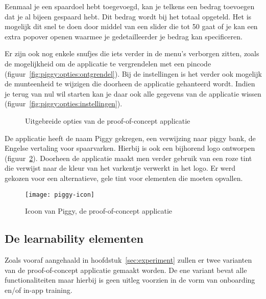 Eenmaal je een spaardoel hebt toegevoegd, kan je telkens een bedrag toevoegen dat je al bijeen gespaard hebt. Dit bedrag wordt bij het totaal opgeteld. Het is mogelijk dit snel te doen door middel van een slider die tot 50 gaat of je kan een extra popover openen waarmee je gedetailleerder je bedrag kan specificeren.

Er zijn ook nog enkele snufjes die iets verder in de menu's verborgen zitten, zoals de mogelijkheid om de applicatie te vergrendelen met een pincode (figuur~\ref{fig:piggy:opties:ontgrendel}). Bij de instellingen is het verder ook mogelijk de munteenheid te wijzigen die doorheen de applicatie gehanteerd wordt. Indien je terug van nul wil starten kan je daar ook alle gegevens van de applicatie wissen (figuur~\ref{fig:piggy:opties:instellingen}).

\begin{figure}[h!]
    \centering
    \qquad
    \caption{Uitgebreide opties van de proof-of-concept applicatie}
    \label{fig:piggy:opties}
\end{figure}

De applicatie heeft de naam Piggy gekregen, een verwijzing naar piggy bank, de Engelse vertaling voor spaarvarken. Hierbij is ook een bijhorend logo ontworpen (figuur~\ref{fig:piggy:icoon}). Doorheen de applicatie maakt men verder gebruik van een roze tint die verwijst naar de kleur van het varkentje verwerkt in het logo. Er werd gekozen voor een alternatieve, gele tint voor elementen die moeten opvallen.

\begin{figure}[h!]
    \centering
    \texttt{[image: piggy-icon]}
    \caption{Icoon van Piggy, de proof-of-concept applicatie}
    \label{fig:piggy:icoon}
\end{figure}

\subsection{De learnability elementen}
\label{sec:applicatie:learnability-elementen}

Zoals vooraf aangehaald in hoofdstuk~\ref{sec:experiment} zullen er twee varianten van de proof-of-concept applicatie gemaakt worden. De ene variant bevat alle functionaliteiten maar hierbij is geen uitleg voorzien in de vorm van onboarding en/of in-app training.

